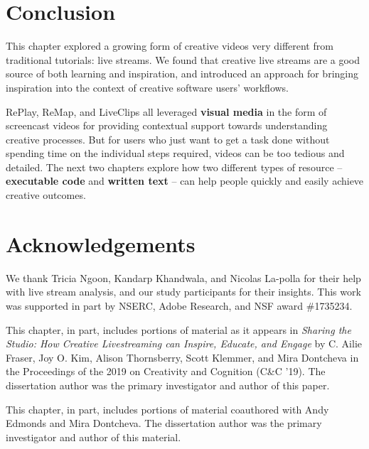 \section{Conclusion}
This chapter explored a growing form of creative videos very different from traditional tutorials: live streams. We found that creative live streams are a good source of both learning and inspiration, and introduced an approach for bringing inspiration into the context of creative software users' workflows. 

RePlay, ReMap, and LiveClips all leveraged \textbf{visual media} in the form of screencast videos for providing contextual support towards understanding creative processes. But for users who just want to get a task done without spending time on the individual steps required, videos can be too tedious and detailed. The next two chapters explore how two different types of resource -- \textbf{executable code} and \textbf{written text} -- can help people quickly and easily achieve creative outcomes.


\section{Acknowledgements}
We thank Tricia Ngoon, Kandarp Khandwala, and Nicolas La-polla for their help with live stream analysis, and our study participants for their insights. This work was supported in part by NSERC, Adobe Research, and NSF award \#1735234.

This chapter, in part, includes portions of material as it appears in \textit{Sharing the Studio: How Creative Livestreaming can Inspire, Educate, and Engage} by C. Ailie Fraser, Joy O. Kim, Alison Thornsberry, Scott Klemmer, and Mira Dontcheva in the Proceedings of the 2019 on Creativity and Cognition (C\&C '19). The dissertation author was the primary investigator and author of this paper.

This chapter, in part, includes portions of material coauthored with Andy Edmonds and Mira Dontcheva. The dissertation author was the primary investigator and author of this material.